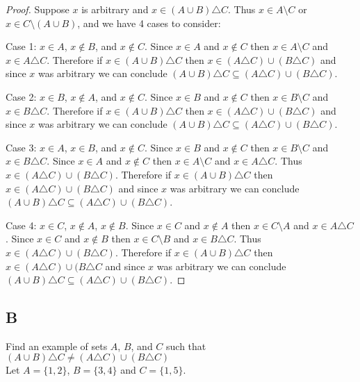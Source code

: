 \documentclass{article}
\begin{document}
\begin{proof}
Suppose $x$ is arbitrary and $x \in (A \cup B) \triangle C$. Thus $x \in A \setminus C$ or $x \in C \setminus (A \cup B)$, and we have 4 cases to consider:

Case 1: $x \in A$, $x \notin B$, and $x \notin C$. Since $x \in A$ and $x \notin C$ then $x \in A \setminus C$ and $x \in A \triangle C$. Therefore if $x \in (A \cup B) \triangle C$ then $x \in (A \triangle C) \cup (B \triangle C)$ and since $x$ was arbitrary we can conclude $(A \cup B) \triangle C \subseteq (A \triangle C) \cup (B \triangle C)$.

Case 2: $x \in B$, $x \notin A$, and $x \notin C$. Since $x \in B$ and $x \notin C$ then $x \in B \setminus C$ and $x \in B \triangle C$. Therefore if $x \in (A \cup B) \triangle C$ then $x \in (A \triangle C) \cup (B \triangle C)$ and since $x$ was arbitrary we can conclude $(A \cup B) \triangle C \subseteq (A \triangle C) \cup (B \triangle C)$.

Case 3: $x \in A$, $x \in B$, and $x \notin C$. Since $x \in B$ and $x \notin C$ then $x \in B \setminus C$ and $x \in B \triangle C$. Since $x \in A$ and $x \notin C$ then $x \in A \setminus C$ and $x \in A \triangle C$. Thus $x \in (A \triangle C) \cup (B \triangle C)$. Therefore if $x \in (A \cup B) \triangle C$ then $ x \in (A \triangle C) \cup (B \triangle C)$ and since $x$ was arbitrary we can conclude $(A \cup B) \triangle C \subseteq (A \triangle C) \cup (B \triangle C)$.

Case 4: $x \in C$, $x \notin A$, $x \notin B$. Since $x \in C$ and $x \notin A$ then $x \in C \setminus A$ and $x \in A \triangle C$. Since $x \in C$ and $x \notin B$ then $x \in C \setminus B$ and $x \in B \triangle C$. Thus $x \in (A \triangle C) \cup (B \triangle C)$. Therefore if $x \in (A \cup B) \triangle C$ then $x \in (A \triangle C) \cup (B \triangle C$ and since $x$ was arbitrary we can conclude $(A \cup B) \triangle C \subseteq (A \triangle C) \cup (B \triangle C)$.
\end{proof}


\subsection*{B}
Find an example of sets $A$, $B$, and $C$ such that $( A \cup B ) \triangle C \neq (A \triangle C) \cup (B \triangle C)$ \\

Let $A = \{1, 2\}$, $B = \{3, 4\}$ and $C = \{1, 5\}$. \\
\end{document}
